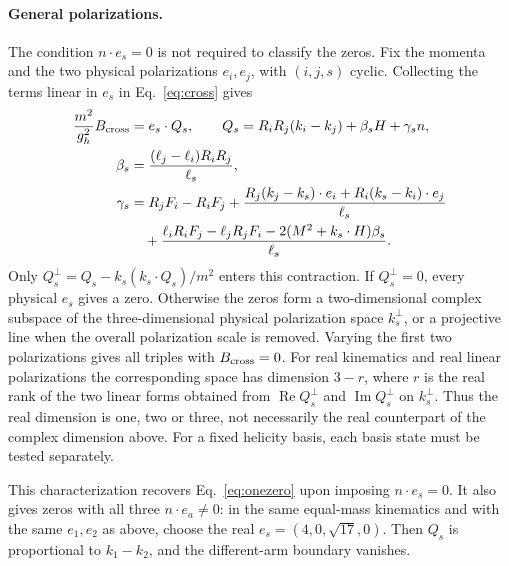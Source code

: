 \documentclass[11pt,a4paper]{article}
\begin{document}
\paragraph{General polarizations.}
The condition \(n\cdot e_s=0\) is not required to classify the zeros.
Fix the momenta and the two physical polarizations \(e_i,e_j\), with
\((i,j,s)\) cyclic. Collecting the terms linear in \(e_s\) in
Eq.~\eqref{eq:cross} gives
\begin{align}
 \frac{m^2}{g_h^2}B_{\rm cross}&=e_s\cdot Q_s,\qquad
 Q_s=R_iR_j(k_i-k_j)+\beta_s H+\gamma_s n,\nonumber\\
 \beta_s&=\frac{(\ell_j-\ell_i)R_iR_j}{\ell_s},\nonumber\\
 \gamma_s&=R_jF_i-R_iF_j
  +\frac{R_j(k_j-k_s)\cdot e_i+R_i(k_s-k_i)\cdot e_j}{\ell_s}
  \nonumber\\
 &\quad+\frac{\ell_iR_iF_j-\ell_jR_jF_i
           -2(M^2+k_s\cdot H)\beta_s}{\ell_s}.
 \label{eq:general-cross-covector}
\end{align}
Only \(Q_s^\perp=Q_s-k_s(k_s\cdot Q_s)/m^2\) enters this
contraction. If \(Q_s^\perp=0\), every physical \(e_s\) gives
a zero. Otherwise the zeros form a two-dimensional complex
subspace of the three-dimensional physical polarization space
\(k_s^\perp\), or a projective line when the overall polarization
scale is removed. Varying the first two polarizations gives all
triples with \(B_{\rm cross}=0\). For real kinematics and real linear
polarizations the corresponding space has dimension \(3-r\), where
\(r\) is the real rank of the two linear forms obtained from
\(\operatorname{Re}Q_s^\perp\) and \(\operatorname{Im}Q_s^\perp\)
on \(k_s^\perp\). Thus the real dimension is one, two or three, not
necessarily the real counterpart of the complex dimension above.
For a fixed helicity basis, each basis state must be tested
separately.

This characterization recovers Eq.~\eqref{eq:onezero} upon imposing
\(n\cdot e_s=0\). It also gives zeros with all three
\(n\cdot e_a\ne0\): in the same equal-mass kinematics and with the same
\(e_1,e_2\) as above, choose the real \(e_s=(4,0,\sqrt{17},0)\).
Then \(Q_s\) is proportional to \(k_1-k_2\), and the different-arm
boundary vanishes.
\end{document}
